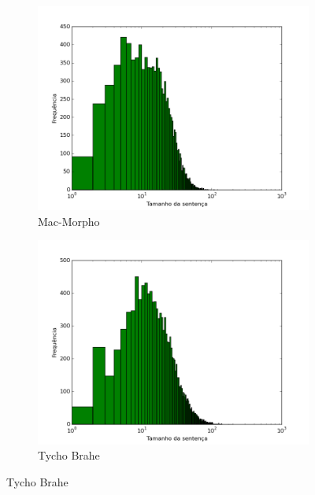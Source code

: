 \begin{figure}[!htb]
  \caption{Distribuição dos comprimentos das sentenças}
  \begin{subfigure}[htb]{0.5\textwidth} 
     \includegraphics[width=\textwidth]{img/distribuicao_macmorphov3_test.png} 
    \caption{Mac-Morpho} \label{fig:distribuicaocorpus1}
  \end{subfigure} 
  \begin{subfigure}[htb]{0.5\textwidth}
    \includegraphics[width=\textwidth]{img/distribuicao_tychobrahe_test.png} 
    \caption{Tycho Brahe} \label{fig:distribuicaocorpus2}
  \end{subfigure} 
\end{figure}




